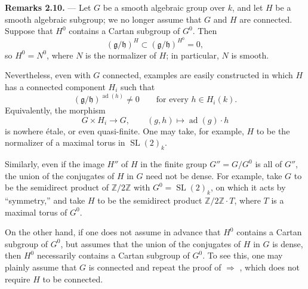 \medskip
\noindent{}\textbf{Remarks 2.10.} ---
Let \(G\) be a smooth algebraic group over \(k\), and let \(H\) be a
smooth algebraic subgroup; we no longer assume that \(G\) and \(H\)
are connected. Suppose that \(H^0\) contains a Cartan subgroup of
\(G^0\). Then
\[
  (\mathfrak g/\mathfrak h)^H
  \subset(\mathfrak g/\mathfrak h)^{H^0}=0,
\]
so \(H^0=N^0\), where \(N\) is the normalizer of \(H\); in
particular, \(N\) is smooth.

Nevertheless, even with \(G\) connected, examples are easily
constructed in which \(H\) has a connected component \(H_i\) such
that
\[
  (\mathfrak g/\mathfrak h)^{\operatorname{ad}(h)}\neq0
  \qquad\text{for every }h\in H_i(k).
\]
Equivalently, the morphism
\[
  G\times H_i\longrightarrow G,\qquad
  (g,h)\longmapsto\operatorname{ad}(g)\cdot h
\]
is nowhere étale, or even quasi-finite. One may take, for example,
\(H\) to be the normalizer of a maximal torus in
\(\operatorname{SL}(2)_k\).

Similarly, even if the image \(H''\) of \(H\) in the finite group
\(G''=G/G^0\) is all of \(G''\), the union of the conjugates of \(H\)
in \(G\) need not be dense. For example, take \(G\) to be the
semidirect product of \(\mathbb Z/2\mathbb Z\) with
\(G^0=\operatorname{SL}(2)_k\), on which it acts by ``symmetry,'' and
take \(H\) to be the semidirect product
\(\mathbb Z/2\mathbb Z\cdot T\), where \(T\) is a maximal torus of
\(G^0\).

On the other hand, if one does not assume in advance that \(H^0\)
contains a Cartan subgroup of \(G^0\), but assumes that the union of
the conjugates of \(H\) in \(G\) is dense, then \(H^0\) necessarily
contains a Cartan subgroup of \(G^0\). To see this, one may plainly
assume that \(G\) is connected and repeat the proof of
 \(\Rightarrow\) , which does not require \(H\) to be
connected.



\makeatletter
{}
\makeatother

